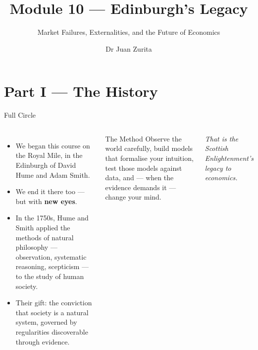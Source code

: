 \documentclass[aspectratio=169, 10pt]{beamer}
\title{Module 10 --- Edinburgh's Legacy}
\subtitle{Market Failures, Externalities, and the Future of Economics}
\author{Dr Juan Zurita}
\institute{From Smith to Simulation\\
The University of Edinburgh~$\cdot$~School of Economics}
\date{}
\begin{document}
\maketitle

\section{Part I --- The History}

\begin{frame}{Full Circle}
\begin{columns}[T]
\begin{itemize}
  \item We began this course on the Royal Mile, in the Edinburgh of
        David Hume and Adam Smith.
  \item We end it there too --- but with \textbf{new eyes}.
  \item In the 1750s, Hume and Smith applied the methods of natural
        philosophy --- observation, systematic reasoning, scepticism ---
        to the study of human society.
  \item Their gift: the conviction that society is a \alert{natural system},
        governed by regularities discoverable through evidence.
\end{itemize}
\begin{block}{The Method}
Observe the world carefully, build models that formalise your intuition,
test those models against data, and --- when the evidence demands it ---
change your mind.
\end{block}
\vspace{0.5em}
\textit{That is the Scottish Enlightenment's legacy to economics.}
\end{columns}
\end{frame}
\end{document}
